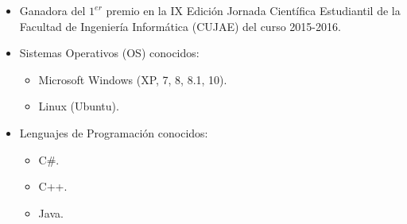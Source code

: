 \documentclass[letterpaper, 12pt, final]{report}
\begin{document}
\begin{itemize}[noitemsep, nolistsep]
	
%	
%	
%	

	\item Ganadora del $1^{er}$ premio en la IX Edición Jornada Científica Estudiantil de la Facultad de Ingeniería Informática (CUJAE) del curso 2015-2016.
%
%
%

	\item Sistemas Operativos (OS) conocidos:

		\begin{itemize}[noitemsep, nolistsep]
			\item Microsoft Windows (XP, 7, 8, 8.1, 10).
			\item Linux (Ubuntu).
		\end{itemize}
	
	\item Lenguajes de Programación conocidos:
		\begin{itemize}[noitemsep, nolistsep]
			\item C\#.
			\item C++.
			\item Java.
		\end{itemize}	
	
\end{itemize}



\end{document}
